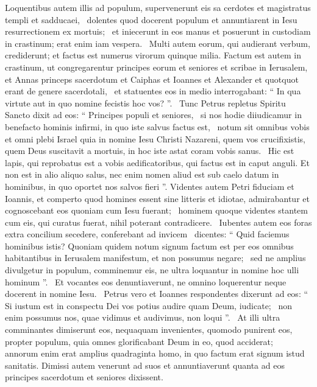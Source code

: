 \begin{biblechapter}
\begin{biblechapter}
\begin{biblechapter}
\begin{biblechapter}
 \verse Loquentibus autem illis ad populum, supervenerunt eis sa cerdotes et magistratus templi et sadducaei, 
 \verse dolentes quod docerent populum et annuntiarent in Iesu resurrectionem ex mortuis; 
 \verse et iniecerunt in eos manus et posuerunt in custodiam in crastinum; erat enim iam vespera. 
 \verse Multi autem eorum, qui audierant verbum, crediderunt; et factus est numerus virorum quinque milia.
 \verse Factum est autem in crastinum, ut congregarentur principes eorum et seniores et scribae in Ierusalem, 
 \verse et Annas princeps sacerdotum et Caiphas et Ioannes et Alexander et quotquot erant de genere sacerdotali, 
 \verse et statuentes eos in medio interrogabant: “ In qua virtute aut in quo nomine fecistis hoc vos? ”. 
 \verse Tunc Petrus repletus Spiritu Sancto dixit ad eos: “ Principes populi et seniores, 
 \verse si nos hodie diiudicamur in benefacto hominis infirmi, in quo iste salvus factus est, 
 \verse notum sit omnibus vobis et omni plebi Israel quia in nomine Iesu Christi Nazareni, quem vos crucifixistis, quem Deus suscitavit a mortuis, in hoc iste astat coram vobis sanus. 
 \verse Hic est
 lapis, qui reprobatus est a vobis aedificatoribus,
 qui factus est in caput anguli.
 \verse Et non est in alio aliquo salus, nec enim nomen aliud est sub caelo datum in hominibus, in quo oportet nos salvos fieri ”.
 \verse Videntes autem Petri fiduciam et Ioannis, et comperto quod homines essent sine litteris et idiotae, admirabantur et cognoscebant eos quoniam cum Iesu fuerant; 
 \verse hominem quoque videntes stantem cum eis, qui curatus fuerat, nihil poterant contradicere. 
 \verse Iubentes autem eos foras extra concilium secedere, conferebant ad invicem 
 \verse dicentes: “ Quid faciemus hominibus istis? Quoniam quidem notum signum factum est per eos omnibus habitantibus in Ierusalem manifestum, et non possumus negare; 
 \verse sed ne amplius divulgetur in populum, comminemur eis, ne ultra loquantur in nomine hoc ulli hominum ”. 
 \verse Et vocantes eos denuntiaverunt, ne omnino loquerentur neque docerent in nomine Iesu. 
 \verse Petrus vero et Ioannes respondentes dixerunt ad eos: “ Si iustum est in conspectu Dei vos potius audire quam Deum, iudicate; 
 \verse non enim possumus nos, quae vidimus et audivimus, non loqui ”. 
 \verse At illi ultra comminantes dimiserunt eos, nequaquam invenientes, quomodo punirent eos, propter populum, quia omnes glorificabant Deum in eo, quod acciderat; 
 \verse annorum enim erat amplius quadraginta homo, in quo factum erat signum istud sanitatis.
 \verse Dimissi autem venerunt ad suos et annuntiaverunt quanta ad eos principes sacerdotum et seniores dixissent. 

\end{biblechapter}
\end{biblechapter}
\end{biblechapter}
\end{biblechapter}
